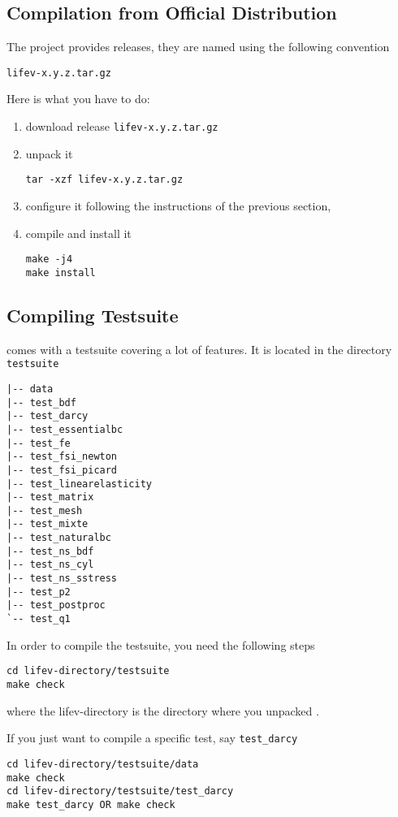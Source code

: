\subsection{Compilation from Official Distribution}
\label{sec:comp-from-offic}
The \lifev project provides releases, they are named using the following convention
\begin{center}
\verb!lifev-x.y.z.tar.gz!
\end{center}

Here is what you have to do:

\begin{enumerate}
\item download \lifev release \verb!lifev-x.y.z.tar.gz!
\item unpack it
\begin{verbatim}
tar -xzf lifev-x.y.z.tar.gz
\end{verbatim}
\item configure it following the instructions of the previous section,
\item compile and install it
\begin{verbatim}
make -j4
make install
\end{verbatim}
\end{enumerate}


\subsection{Compiling Testsuite}

\noindent \lifev comes with a testsuite covering a lot of features. It is located in the directory \verb+testsuite+
\begin{verbatim}
|-- data
|-- test_bdf
|-- test_darcy
|-- test_essentialbc
|-- test_fe
|-- test_fsi_newton
|-- test_fsi_picard
|-- test_linearelasticity
|-- test_matrix
|-- test_mesh
|-- test_mixte
|-- test_naturalbc
|-- test_ns_bdf
|-- test_ns_cyl
|-- test_ns_sstress
|-- test_p2
|-- test_postproc
`-- test_q1
\end{verbatim}

\noindent In order to compile the testsuite, you need the following steps
\begin{verbatim}
cd lifev-directory/testsuite
make check
\end{verbatim}
where the lifev-directory is the directory where you unpacked \lifev.

\noindent If you just want to compile a specific test, say \verb+test_darcy+
\begin{verbatim}
cd lifev-directory/testsuite/data
make check
cd lifev-directory/testsuite/test_darcy
make test_darcy OR make check
\end{verbatim}

%
%
